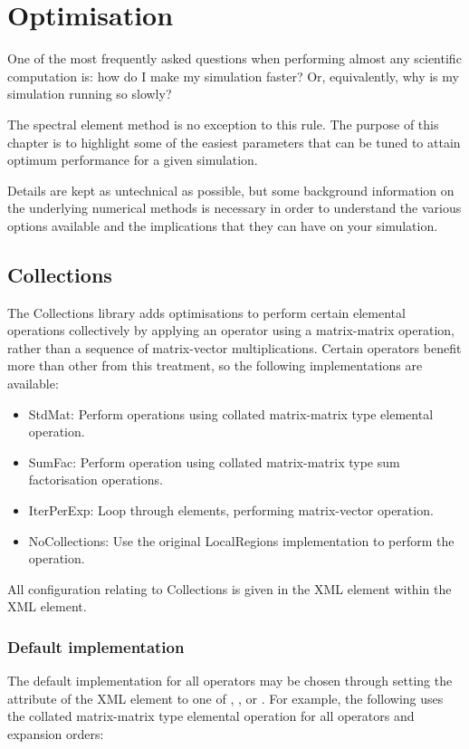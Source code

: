 \chapter{Optimisation}

One of the most frequently asked questions when performing almost any scientific
computation is: how do I make my simulation faster? Or, equivalently, why is my
simulation running so slowly?

The spectral element method is no exception to this rule. The purpose of this
chapter is to highlight some of the easiest parameters that can be tuned to
attain optimum performance for a given simulation.

Details are kept as untechnical as possible, but some background information on
the underlying numerical methods is necessary in order to understand the various
options available and the implications that they can have on your simulation.

\section{Collections}
The Collections library adds optimisations to perform certain elemental
operations collectively by applying an operator using a matrix-matrix operation,
rather than a sequence of matrix-vector multiplications. Certain operators
benefit more than other from this treatment, so the following implementations
are available:
\begin{itemize}
    \item StdMat: Perform operations using collated matrix-matrix type elemental
        operation.
    \item SumFac: Perform operation using collated matrix-matrix type sum
        factorisation operations.
    \item IterPerExp: Loop through elements, performing matrix-vector operation.
    \item NoCollections: Use the original LocalRegions implementation to
        perform the operation.
\end{itemize}
All configuration relating to Collections is given in the 
XML element within the  XML element.

\subsection{Default implementation}
The default implementation for all operators may be chosen through setting the
 attribute of the  XML element to one of
, ,  or . For
example, the following uses the collated matrix-matrix type elemental operation
for all operators and expansion orders:

